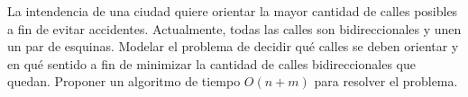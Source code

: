 
 \item La intendencia de una ciudad quiere orientar la mayor cantidad de calles posibles a fin de evitar accidentes.  Actualmente, todas las calles son bidireccionales y unen un par de esquinas.  Modelar el problema de decidir qué calles se deben orientar y en qué sentido a fin de minimizar la cantidad de calles bidireccionales que quedan.  Proponer un algoritmo de tiempo $O(n+m)$ para resolver el problema.

 
